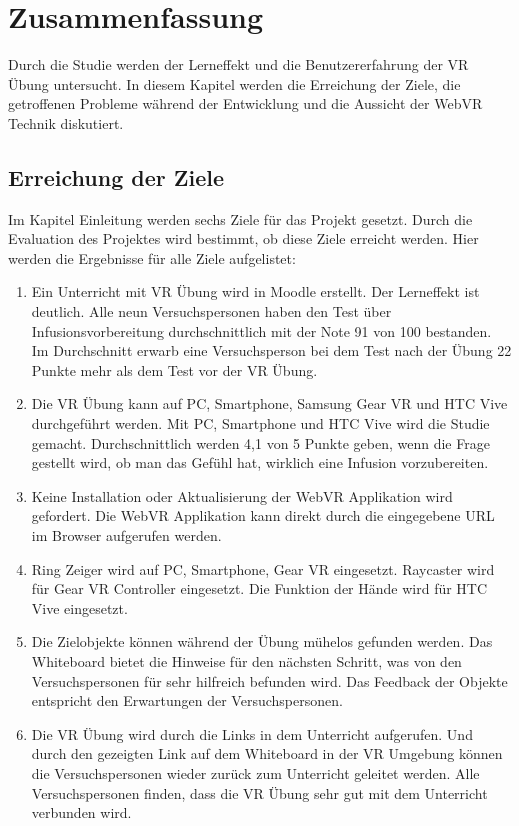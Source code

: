 \chapter{Zusammenfassung}

Durch die Studie werden der Lerneffekt und die Benutzererfahrung der VR Übung untersucht. In diesem Kapitel werden die Erreichung der Ziele, die getroffenen Probleme während der Entwicklung und die Aussicht der WebVR Technik diskutiert.

\section{Erreichung der Ziele}

Im Kapitel Einleitung werden sechs Ziele für das Projekt gesetzt. Durch die Evaluation des Projektes wird bestimmt, ob diese Ziele erreicht werden. Hier werden die Ergebnisse für alle Ziele aufgelistet:

\begin{enumerate}[labelsep=1ex]
	\renewcommand{\labelenumi}{\textbf{Z\theenumi.}}
	\item Ein Unterricht mit VR Übung wird in Moodle erstellt. Der Lerneffekt ist deutlich. Alle neun Versuchspersonen haben den Test über Infusionsvorbereitung durchschnittlich mit der Note 91 von 100 bestanden. Im Durchschnitt erwarb eine Versuchsperson bei dem Test nach der Übung 22 Punkte mehr als dem Test vor der VR Übung.
	
	\item Die VR Übung kann auf PC, Smartphone, Samsung Gear VR und HTC Vive durchgeführt werden. Mit PC, Smartphone und HTC Vive wird die Studie gemacht. Durchschnittlich werden 4,1 von 5 Punkte geben, wenn die Frage gestellt wird, ob man das Gefühl hat, wirklich eine Infusion vorzubereiten.
	
	\item Keine Installation oder Aktualisierung der WebVR Applikation wird gefordert. Die WebVR Applikation kann direkt durch die eingegebene URL im Browser aufgerufen werden.
	
	\item Ring Zeiger wird auf PC, Smartphone, Gear VR eingesetzt. Raycaster wird für Gear VR Controller eingesetzt. Die Funktion der Hände wird für HTC Vive eingesetzt.
	
	\item Die Zielobjekte können während der Übung mühelos gefunden werden. Das Whiteboard bietet die Hinweise für den nächsten Schritt, was von den Versuchspersonen für sehr hilfreich befunden wird. Das Feedback der Objekte entspricht den Erwartungen der Versuchspersonen.
	
	\item Die VR Übung wird durch die Links in dem Unterricht aufgerufen. Und durch den gezeigten Link auf dem Whiteboard in der VR Umgebung können die Versuchspersonen wieder zurück zum Unterricht geleitet werden. Alle Versuchspersonen finden, dass die VR Übung sehr gut mit dem Unterricht verbunden wird.
	
\end{enumerate}

